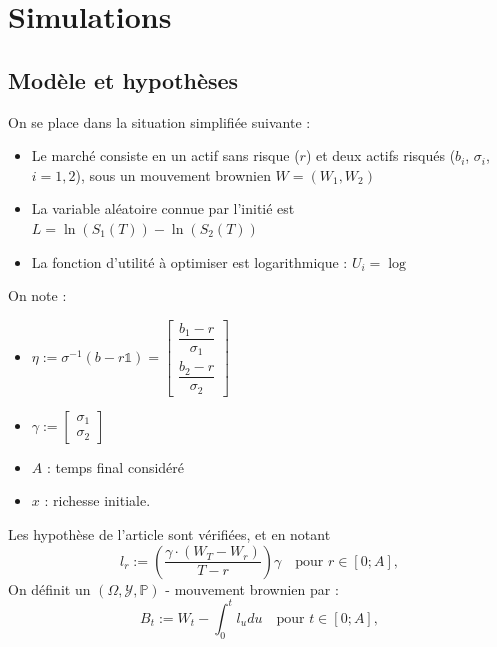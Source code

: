 \documentclass[french]{beamer}
\begin{document}
\section{Simulations}
\subsection{Modèle et hypothèses}
\begin{frame}
On se place dans la situation simplifiée suivante : 
\begin{itemize}
	\item Le marché consiste en un actif sans risque ($r$) et deux actifs risqués ($b_{i}$, $\sigma_{i}$, $i = 1, 2$), sous un mouvement brownien $W = \left( W_{1}, W_{2} \right)$
	\item La variable aléatoire connue par l'initié est $L = \ln\left(S_{1} \left(T \right) \right) - \ln\left( S_{2} \left( T \right) \right)$
	\item La fonction d'utilité à optimiser est logarithmique : $U_{i} = \log$
\end{itemize}
\end{frame}

\begin{frame}
On note : 
\begin{itemize}
	\item $\eta := \sigma^{-1} \left( b - r \mathds{1} \right) = \begin{bmatrix} \dfrac{b_{1} - r}{\sigma_{1}} \\ \dfrac{b_{2} - r}{\sigma_{2}} \end{bmatrix}$
	\item $\gamma := \begin{bmatrix} \sigma_{1} \\ \sigma_{2} \end{bmatrix}$
	\item $A$ : temps final considéré
	\item $x$ : richesse initiale.
\end{itemize}
\end{frame}

\begin{frame}
Les hypothèse de l'article sont vérifiées, et en notant 
\begin{displaymath}
	l_{r} := \left( \dfrac{\gamma\cdot \left( W_{T} - W_{r} \right)}{T - r} \right) \gamma \quad \text{pour } r \in \left[ 0; A\right],
\end{displaymath}
On définit un $\left( \Omega, \mathcal{Y}, \mathbb{P} \right)$ - mouvement brownien par :
\begin{displaymath}
	B_{t} := W_{t} - \int_{0}^{t} l_{u} du \quad \text{pour } t \in \left[ 0; A\right],
\end{displaymath}
\end{frame}
\end{document}
